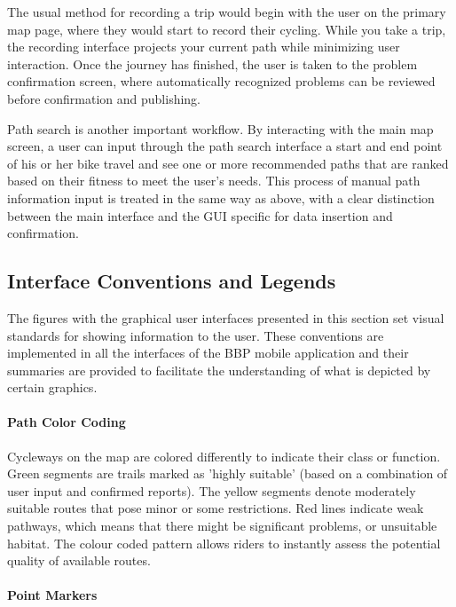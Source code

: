 The usual method for recording a trip would begin with the user on the primary map page, where they would start to record their cycling.
While you take a trip, the recording interface projects your current path while minimizing user interaction.
Once the journey has finished, the user is taken to the problem confirmation screen, where automatically recognized problems can be reviewed before confirmation and publishing.

Path search is another important workflow.
By interacting with the main map screen, a user can input through the path search interface a start and end point of his or her bike travel and see one or more recommended paths that are ranked based on their fitness to meet the user's needs.
This process of manual path information input is treated in the same way as above, with a clear distinction between the main interface and the GUI specific for data insertion and confirmation.
\subsection{Interface Conventions and Legends}

The figures with the graphical user interfaces presented in this section set visual standards for showing information to the user.
These conventions are implemented in all the interfaces of the BBP mobile application and their summaries are provided to facilitate the understanding of what is depicted by certain graphics.

\paragraph{Path Color Coding}

Cycleways on the map are colored differently to indicate their class or function.
Green segments are trails marked as 'highly suitable' (based on a combination of user input and confirmed reports).
The yellow segments denote moderately suitable routes that pose minor or some restrictions.
Red lines indicate weak pathways, which means that there might be significant problems, or unsuitable habitat.
The colour coded pattern allows riders to instantly assess the potential quality of available routes.

\paragraph{Point Markers}

